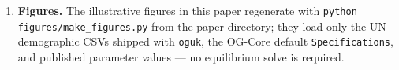 \begin{enumerate}
\item \textbf{Figures.} The illustrative figures in this paper regenerate with \texttt{python figures/\allowbreak make\_\allowbreak figures.py} from the paper directory; they load only the UN demographic CSVs shipped with \texttt{oguk}, the OG-Core default \texttt{Specifications}, and published parameter values --- no equilibrium solve is required.
\end{enumerate}
